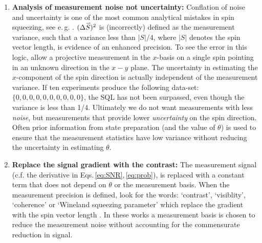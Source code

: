 \documentclass[reqno]{amsart}
\newcommand{\myvec}[1]{\accentset{\rightharpoonup}{#1}}
\begin{document}
\begin{enumerate}
\item \textbf{Analysis of measurement noise not uncertainty:} Conflation of noise and uncertainty is one of the most common analytical mistakes in spin squeezing, see e.\,g. \cite{Orzel2001, Esteve2008, Appel2009, Gross2010, Koschorreck2010, Koschorreck2010a, Leroux2010, LouchetChauvet2010, Riedel2010, SchleierSmith2010, Sewell2012, Cox2016, Hosten2016, Kruse2016, Colombo2022, Greve2022, Malia2022}. $(\Delta \myvec{S})^2$ is (incorrectly) defined as the measurement variance, such that a variance less than $|S|/4$, where $|S|$ denotes the spin vector length, is evidence of an enhanced precision. To see the error in this logic, allow a projective measurement in the $x$-basis on a single spin pointing in an unknown direction in the $x-y$ plane. The uncertainty in estimating the $x$-component of the spin direction is actually independent of the measurement variance. If ten experiments produce the following data-set: $\{0,0,0,0,0,0,0,0,0,0\}$, the SQL has not been surpassed, even though the variance is less than 1/4. Ultimately we do not want measurements with less \emph{noise}, but measurements that provide lower \emph{uncertainty} on the spin direction. Often prior information from state preparation (and the value of $\theta$) is used to ensure that the measurement statistics have low variance without reducing the uncertainty in estimating $\theta$.


\item \textbf{Replace the signal gradient with the contrast:} The measurement signal (c.f. the derivative in Eqs.\,\eqref{eq:SNR},\,\eqref{eq:prob}), is replaced with a constant term that does not depend on $\theta$ or the measurement basis. When the measurement precision is defined, look for the words: `contrast', `visiblity', `coherence' or `Wineland squeezing parameter' which replace the gradient with the spin vector length \cite{Meyer2001, Esteve2008, Gross2010, Leroux2010, Leroux2010a, Riedel2010, Hosten2016, PedrozoPenafiel2020, Malia2020, Malia2022}. In these works a measurement basis is chosen to reduce the measurement noise without accounting for the commensurate reduction in signal.

\end{enumerate}
\end{document}
